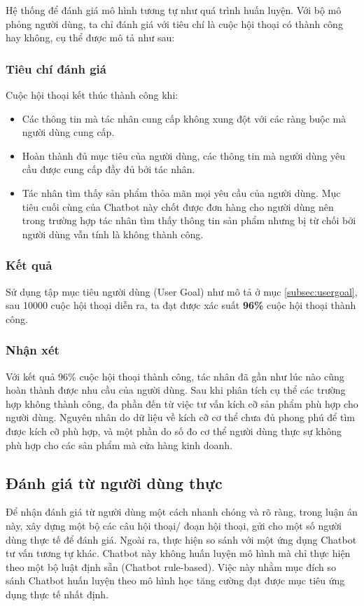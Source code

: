 Hệ thống để đánh giá mô hình tương tự như quá trình huấn luyện.
Với bộ mô phỏng người dùng, ta chỉ đánh giá với tiêu chí là cuộc
hội thoại có thành công hay không, cụ thể được mô tả như sau:

\subsubsection{Tiêu chí đánh giá}
Cuộc hội thoại kết thúc thành công khi:

\begin{itemize}
    \item Các thông tin mà tác nhân cung cấp không xung đột với
    các ràng buộc mà người dùng cung cấp.
    \item Hoàn thành đủ mục tiêu của người dùng, các thông tin mà
    người dùng yêu cầu được cung cấp đầy đủ bởi tác nhân.
    \item Tác nhân tìm thấy sản phẩm thỏa mãn mọi yêu cầu của
    người dùng. Mục tiêu cuối cùng của Chatbot này chốt được đơn hàng
    cho người dùng nên trong trường hợp tác nhân tìm thấy thông tin
    sản phẩm nhưng bị từ chối bởi người dùng vẫn tính là không thành công.
\end{itemize}

\subsubsection{Kết quả}
Sử dụng tập mục tiêu người dùng (User Goal) như mô tả ở mục
\ref{subsec:usergoal}, sau 10000 cuộc hội thoại diễn ra, ta đạt được
xác suất \textbf{96\%} cuộc hội thoại thành công.

\subsubsection{Nhận xét}
Với kết quả 96\% cuộc hội thoại thành công, tác nhân đã gần như lúc nào
cũng hoàn thành được nhu cầu của người dùng. Sau khi phân tích cụ thể
các trường hợp không thành công, đa phần đến từ việc tư vấn kích cỡ
sản phẩm phù hợp cho người dùng. Nguyên nhân do dữ liệu về kích cỡ
cơ thể chưa đủ phong phú để tìm được kích cỡ phù hợp, và một phần do
số đo cơ thể người dùng thực sự không phù hợp cho các sản phẩm mà
cửa hàng kinh doanh.

\subsection{Đánh giá từ người dùng thực}
Để nhận đánh giá từ người dùng một cách nhanh chóng và rõ ràng, trong
luận án này, xây dựng một bộ các câu hội thoại/ đoạn hội thoại, gửi
cho một số người dùng thực tế để đánh giá. Ngoài ra, thực hiện so sánh
với một ứng dụng Chatbot tư vấn tương tự khác. Chatbot này không
huấn luyện mô hình mà chỉ thực hiện theo một bộ luật định sẵn (Chatbot
rule-based). Việc này nhằm mục đích so sánh Chatbot huấn luyện theo
mô hình học tăng cường đạt được mục tiêu ứng dụng thực tế nhất định.

